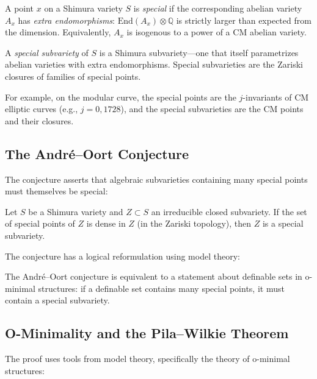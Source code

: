 \begin{definition}
A point $x$ on a Shimura variety $S$ is \emph{special} if the corresponding abelian variety $A_x$ has \emph{extra endomorphisms}: $\text{End}(A_x) \otimes \mathbb{Q}$ is strictly larger than expected from the dimension. Equivalently, $A_x$ is isogenous to a power of a CM abelian variety.
\end{definition}

\begin{definition}
A \emph{special subvariety} of $S$ is a Shimura subvariety---one that itself parametrizes abelian varieties with extra endomorphisms. Special subvarieties are the Zariski closures of families of special points.
\end{definition}

For example, on the modular curve, the special points are the $j$-invariants of CM elliptic curves (e.g., $j = 0, 1728$), and the special subvarieties are the CM points and their closures.

\subsection{The André--Oort Conjecture}

The conjecture asserts that algebraic subvarieties containing many special points must themselves be special:

\begin{conjecture}
Let $S$ be a Shimura variety and $Z \subset S$ an irreducible closed subvariety. If the set of special points of $Z$ is dense in $Z$ (in the Zariski topology), then $Z$ is a special subvariety.
\end{conjecture}

The conjecture has a logical reformulation using model theory:

\begin{fact}
The André--Oort conjecture is equivalent to a statement about definable sets in o-minimal structures: if a definable set contains many special points, it must contain a special subvariety.
\end{fact}

\subsection{O-Minimality and the Pila--Wilkie Theorem}

The proof uses tools from model theory, specifically the theory of o-minimal structures:

